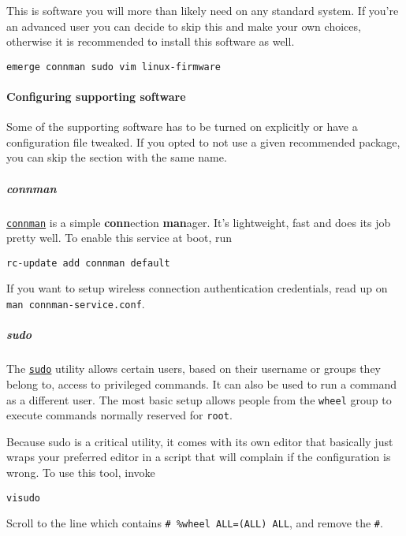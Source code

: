 This is software you will more than likely need on any standard system.
If you're an advanced user you can decide to skip this and make your own
choices, otherwise it is recommended to install this software as well.

\begin{verbatim}
emerge connman sudo vim linux-firmware
\end{verbatim}

\paragraph{Configuring supporting
software}\label{configuring-supporting-software}

Some of the supporting software has to be turned on explicitly or have a
configuration file tweaked. If you opted to not use a given recommended
package, you can skip the section with the same name.

\subparagraph{connman}\label{connman}

\href{https://en.wikipedia.org/wiki/ConnMan}{\texttt{connman}} is a
simple \textbf{conn}ection \textbf{man}ager. It's lightweight, fast and
does its job pretty well. To enable this service at boot, run

\begin{verbatim}
rc-update add connman default
\end{verbatim}

If you want to setup wireless connection authentication credentials,
read up on \texttt{man\ connman-service.conf}.

\subparagraph{sudo}\label{sudo}

The \href{https://en.wikipedia.org/wiki/Sudo}{\texttt{sudo}} utility
allows certain users, based on their username or groups they belong to,
access to privileged commands. It can also be used to run a command as a
different user. The most basic setup allows people from the
\texttt{wheel} group to execute commands normally reserved for
\texttt{root}.

Because sudo is a critical utility, it comes with its own editor that
basically just wraps your preferred editor in a script that will
complain if the configuration is wrong. To use this tool, invoke

\begin{verbatim}
visudo
\end{verbatim}

Scroll to the line which contains \texttt{\#\ \%wheel\ ALL=(ALL)\ ALL},
and remove the \texttt{\#}.

